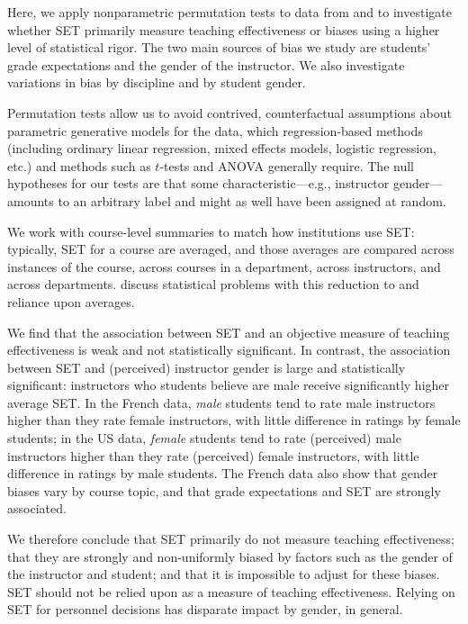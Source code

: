 \documentclass[12pt]{article}
\begin{document}
Here, we apply nonparametric permutation tests to data from \citet{Boring2015} and 
\citet{MacNell2014} to investigate whether SET primarily measure teaching effectiveness or 
biases using a higher level of statistical rigor.
The two main sources of bias we study are students' grade expectations and the gender of the 
instructor. 
We also investigate variations in bias by discipline and by student gender.

Permutation tests allow us to avoid 
contrived, counterfactual assumptions about
parametric generative models for the data, which regression-based methods (including
ordinary linear regression, mixed effects models, logistic regression, etc.) and
methods such as $t$-tests and ANOVA generally require.
The null hypotheses for our tests are that some 
characteristic---e.g., instructor gender---amounts to an arbitrary label and might as well
have been assigned at random. 

We work with course-level summaries to match how institutions use SET: 
typically, SET for a course
are averaged, and those averages are compared across instances of the course,
across courses in a department, across instructors, and across departments.
\citet{StarkFreishtat2014} discuss statistical problems with this reduction to 
and reliance upon averages.

We find that the association between SET and an objective measure of teaching effectiveness 
is weak and not statistically significant.
In contrast, the association between SET and (perceived) instructor gender 
is large and statistically significant:
instructors who students believe are male receive significantly higher average SET.
In the French data, \emph{male} students tend to rate male instructors higher
than they rate female instructors, with little difference in ratings by female students;
in the US data, \emph{female} students tend to rate (perceived) male instructors 
higher than they rate (perceived) female instructors, with little difference in ratings by male students. 
The French data also show that gender biases vary by course topic, and 
that grade expectations and SET are strongly associated.

We therefore conclude that SET primarily do not measure teaching effectiveness; that 
they are strongly and non-uniformly biased by factors such as the gender of the instructor
and student; and that it is impossible to adjust for these biases. 
SET should not be relied upon as a measure of teaching effectiveness.
Relying on SET for personnel decisions has disparate impact by gender, in general. 
\end{document}
